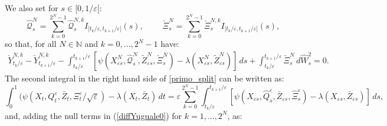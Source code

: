 \documentclass[reqno,a4paper,11 pt]{article}
\def \e {\varepsilon}
\numberwithin{equation}{section}
\begin{document}
We also set for $  s\in [0,1/\e[$:
\begin{equation}\label{def-QNXIN}
\hat{\mathcal{Q}}^N_s=\sum_{k=0}^{2^N-1} \hat{\mathcal{Q}}^{N,k}_s I_{[t_k/\e, t_{k+1}/\e[}(s), \; \qquad\check{\Xi}^N_s=\sum_{k=0}^{2^N-1} \check{\Xi}^{N,k}_s I_{[t_k/\e, t_{k+1}/\e[}(s) ,\end{equation}
so that, for all $N\in \mathbb{N}$ and $k=0,..., 2^N-1$ have:
\begin{align}\label{diffYuguale0}
\check{Y}^{N,k}_{t_{k}/\e}-\check{Y}^{N,k}_{t_{k+1}/\e }-\int_{t_{k}/\e }^{t_{k+1}/\e}[\psi({X}^N_{\e s},\hat{\mathcal{Q}}^N_s,\widetilde{Z}^N_{\e s},\check{\Xi}^{N}_s)-\lambda({X}^N_{\e s},\widetilde{Z}^N_{\e s})]\, ds + 
\int_{t_{k}/\e }^{t_{k+1}/\e }\check{\Xi}^{N}_s \, d\hat{W}^2_s=0.
\end{align}
The second integral in the right hand side of \eqref{primo_split} can be written as:
$$
\int_0^1  (\psi({X}_t,Q^\e_t,\bar{Z}_t,\Xi^\e_t/\sqrt{\e}) -\lambda({X}_t,\bar{Z}_t)\,dt=\e \sum _{k=0}^{2^N-1}\int_{t_k/\e}^{t_{k+1}/\e}  [\psi(X_{\e s},\hat{Q}^\e_{ s},\bar{Z}_{\e s},\hat{ \Xi}^\e_{s}) -\lambda({X}_{\e s},\bar{Z}_{\e s})]\,ds,$$
and, adding the null terms in (\ref{diffYuguale0}) for $k=1,..., 2^N$, as:
\end{document}
